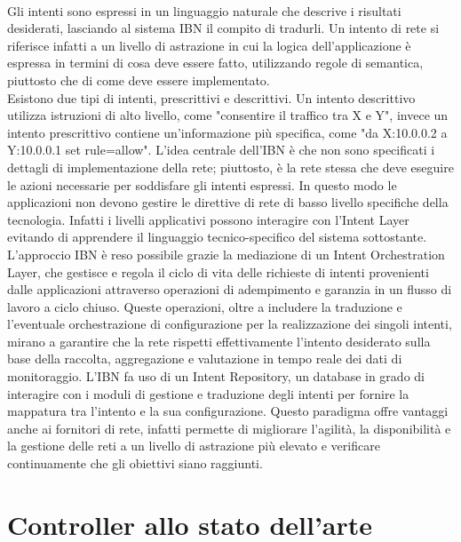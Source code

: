 \\Gli intenti sono espressi in un linguaggio naturale che descrive i risultati desiderati, lasciando al sistema IBN il compito di tradurli.
Un intento di rete si riferisce infatti a un livello di astrazione in cui la logica dell'applicazione è espressa in termini di cosa deve essere fatto, utilizzando regole di semantica, piuttosto che di come deve essere implementato.
\\Esistono due tipi di intenti, prescrittivi e descrittivi.
Un intento descrittivo utilizza istruzioni di alto livello, come "consentire il traffico tra X e Y", invece un intento prescrittivo contiene un'informazione 
più specifica, come "da X:10.0.0.2 a Y:10.0.0.1 set rule=allow".
L'idea centrale dell'IBN è che non sono specificati i dettagli di implementazione della rete; piuttosto, è la rete stessa che deve eseguire le azioni necessarie per soddisfare gli intenti espressi.
In questo modo le applicazioni non devono gestire le direttive di rete di basso livello specifiche della tecnologia. Infatti i livelli applicativi possono interagire con l'Intent Layer evitando di apprendere il linguaggio tecnico-specifico del sistema sottostante.
L'approccio IBN è reso possibile grazie la mediazione di un Intent Orchestration Layer, che gestisce e regola il ciclo di vita delle richieste di intenti provenienti dalle applicazioni attraverso operazioni 
di adempimento e garanzia in un flusso di lavoro a ciclo chiuso.
Queste operazioni, oltre a includere la traduzione e l'eventuale orchestrazione di configurazione per la realizzazione dei singoli intenti, mirano a garantire che la rete rispetti effettivamente l'intento desiderato 
sulla base della raccolta, aggregazione e valutazione in tempo reale dei dati di monitoraggio.
L'IBN fa uso di un Intent Repository, un database in grado di interagire con i moduli di gestione e traduzione 
degli intenti per fornire la mappatura tra l'intento e la sua configurazione.
Questo paradigma offre vantaggi anche ai fornitori di rete, infatti permette di migliorare l'agilità, la disponibilità
e la gestione delle reti a un livello di astrazione più elevato e verificare continuamente che gli obiettivi siano raggiunti. 


\section{Controller allo stato dell'arte}
